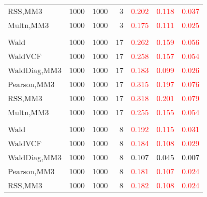 \documentclass[
]{article}
\begin{document}
\begin{table}[H]
{\begin{tabular}[t]{lrrrrrr}
\hspace{1em}RSS,MM3 & 1000 & 1000 & 3 & \textcolor{red}{0.202} & \textcolor{red}{0.118} & \textcolor{red}{0.037}\\
\hspace{1em}Multn,MM3 & 1000 & 1000 & 3 & \textcolor{red}{0.175} & \textcolor{red}{0.111} & \textcolor{red}{0.025}\\
\addlinespace[0.3em]
\multicolumn{7}{l}{\textbf{1F 15V}}\\
\hspace{1em}Wald & 1000 & 1000 & 17 & \textcolor{red}{0.262} & \textcolor{red}{0.159} & \textcolor{red}{0.056}\\
\hspace{1em}WaldVCF & 1000 & 1000 & 17 & \textcolor{red}{0.258} & \textcolor{red}{0.157} & \textcolor{red}{0.054}\\
\hspace{1em}WaldDiag,MM3 & 1000 & 1000 & 17 & \textcolor{red}{0.183} & \textcolor{red}{0.099} & \textcolor{red}{0.026}\\
\hspace{1em}Pearson,MM3 & 1000 & 1000 & 17 & \textcolor{red}{0.315} & \textcolor{red}{0.197} & \textcolor{red}{0.076}\\
\hspace{1em}RSS,MM3 & 1000 & 1000 & 17 & \textcolor{red}{0.318} & \textcolor{red}{0.201} & \textcolor{red}{0.079}\\
\hspace{1em}Multn,MM3 & 1000 & 1000 & 17 & \textcolor{red}{0.255} & \textcolor{red}{0.155} & \textcolor{red}{0.054}\\
\addlinespace[0.3em]
\multicolumn{7}{l}{\textbf{2F 10V}}\\
\hspace{1em}Wald & 1000 & 1000 & 8 & \textcolor{red}{0.192} & \textcolor{red}{0.115} & \textcolor{red}{0.031}\\
\hspace{1em}WaldVCF & 1000 & 1000 & 8 & \textcolor{red}{0.184} & \textcolor{red}{0.108} & \textcolor{red}{0.029}\\
\hspace{1em}WaldDiag,MM3 & 1000 & 1000 & 8 & \textcolor{black}{0.107} & \textcolor{black}{0.045} & \textcolor{black}{0.007}\\
\hspace{1em}Pearson,MM3 & 1000 & 1000 & 8 & \textcolor{red}{0.181} & \textcolor{red}{0.107} & \textcolor{red}{0.024}\\
\hspace{1em}RSS,MM3 & 1000 & 1000 & 8 & \textcolor{red}{0.182} & \textcolor{red}{0.108} & \textcolor{red}{0.024}\\

\end{tabular}}
\end{table}
\end{document}
